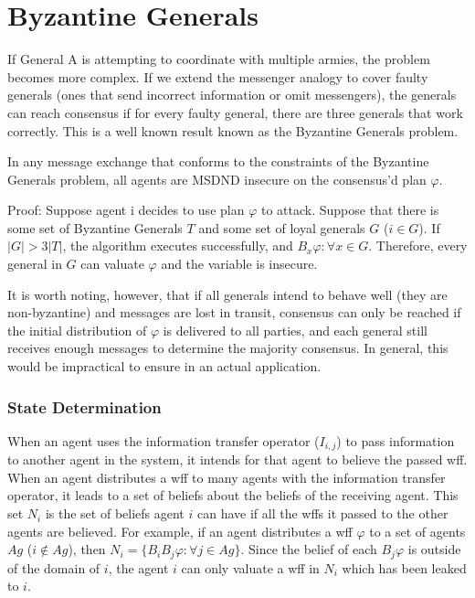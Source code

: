 \section{Byzantine Generals}

If General A is attempting to coordinate with multiple armies, the problem becomes more complex. If we extend the messenger analogy to cover faulty generals (ones that send incorrect information or omit messengers), the generals can reach consensus if for every faulty general, there are three generals that work correctly. This is a well known result known as the Byzantine Generals problem.

\begin{thm}
In any message exchange that conforms to the constraints of the Byzantine Generals problem, all agents are MSDND insecure on the consensus'd plan $\varphi$.
\end{thm}

Proof: Suppose agent i decides to use plan $\varphi$ to attack. Suppose that there is some set of Byzantine Generals $T$ and some set of loyal generals $G$ ($i \in G$). If $|G| > 3|T|$, the algorithm executes successfully, and $B_x \varphi : \forall x \in G $. Therefore, every general in $G$ can valuate $\varphi$ and the variable is insecure.

It is worth noting, however, that if all generals intend to behave well (they are non-byzantine) and messages are lost in transit, consensus can only be reached if the initial distribution of $\varphi$ is delivered to all parties, and each general still receives enough messages to determine the majority consensus. In general, this would be impractical to ensure in an actual application.

\subsubsection{State Determination}

When an agent uses the information transfer operator ($I_{i,j}$) to pass information to another agent in the system, it intends for that agent to believe the passed wff. When an agent distributes a wff to many agents with the information transfer operator, it leads to a set of beliefs about the beliefs of the receiving agent. This set $N_i$ is the set of beliefs agent $i$ can have if all the wffs it passed to the other agents are believed. For example, if an agent distributes a wff $\varphi$ to a set of agents $Ag$ ($i \not \in Ag$), then $N_i = \{ B_i B_j \varphi : \forall j \in Ag \}$. Since the belief of each $B_j \varphi$ is outside of the domain of $i$, the agent $i$ can only valuate a wff in $N_i$ which has been leaked to $i$.

